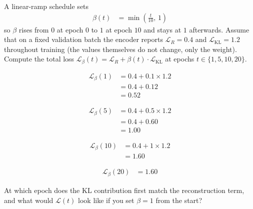 \vspace{2.5em}


A linear-ramp schedule sets
\begin{align*}
    \beta(t) &= \min\!\left(\tfrac{t}{10},\, 1\right)
\end{align*}
so $\beta$ rises from $0$ at epoch $0$ to $1$ at epoch $10$ and stays at $1$ afterwards. Assume that on a fixed validation batch the encoder reports $\mathcal{L}_R{=}0.4$ and $\mathcal{L}_{\text{KL}}{=}1.2$ throughout training (the values themselves do not change, only the weight). Compute the total loss $\mathcal{L}_\beta(t) = \mathcal{L}_R + \beta(t) \cdot \mathcal{L}_{\text{KL}}$ at epochs $t \in \{1, 5, 10, 20\}$.

\begin{align*}
    \mathcal{L}_\beta(1) &= 0.4 + 0.1 \times 1.2 \\
                          &= 0.4 + 0.12 \\
                          &= 0.52
\end{align*}

\begin{align*}
    \mathcal{L}_\beta(5) &= 0.4 + 0.5 \times 1.2 \\
                          &= 0.4 + 0.60 \\
                          &= 1.00
\end{align*}

\begin{align*}
    \mathcal{L}_\beta(10) &= 0.4 + 1 \times 1.2 \\
                           &= 1.60
\end{align*}

\begin{align*}
    \mathcal{L}_\beta(20) &= 1.60
\end{align*}

At which epoch does the KL contribution first match the reconstruction term, and what would $\mathcal{L}(t)$ look like if you set $\beta{=}1$ from the start?


